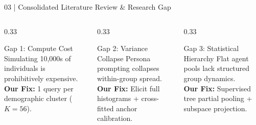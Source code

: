 \documentclass[10pt,aspectratio=169]{beamer}
\begin{document}
\begin{frame}{03 | Consolidated Literature Review \& Research Gap}
    \vspace{0.1cm}
    \begin{columns}[T]
        \begin{column}{0.33\textwidth}
            \begin{block}{\scriptsize Gap 1: Compute Cost}
                \tiny Simulating 10,000s of individuals is prohibitively expensive. \\
                \textbf{Our Fix:} 1 query per demographic cluster ($K=56$).
            \end{block}
        \end{column}
        \begin{column}{0.33\textwidth}
            \begin{block}{\scriptsize Gap 2: Variance Collapse}
                \tiny Persona prompting collapses within-group spread. \\
                \textbf{Our Fix:} Elicit full histograms + cross-fitted anchor calibration.
            \end{block}
        \end{column}
        \begin{column}{0.33\textwidth}
            \begin{block}{\scriptsize Gap 3: Statistical Hierarchy}
                \tiny Flat agent pools lack structured group dynamics. \\
                \textbf{Our Fix:} Supervised tree partial pooling + subspace projection.
            \end{block}
        \end{column}
    \end{columns}
\end{frame}
\end{document}
